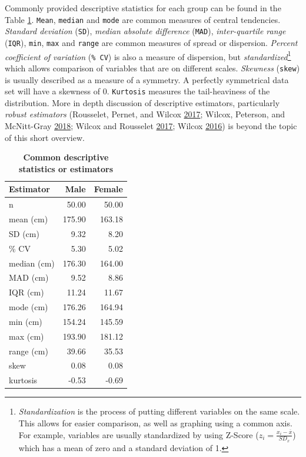 \documentclass[
]{book}
\begin{document}
Commonly provided descriptive statistics for each group can be found in the Table \ref{tab:common-descriptive-statistics-or-estimators}. \texttt{Mean}, \texttt{median} and \texttt{mode} are common measures of central tendencies. \emph{Standard deviation} (\texttt{SD}), \emph{median absolute difference} (\texttt{MAD}), \emph{inter-quartile range} (\texttt{IQR}), \texttt{min}, \texttt{max} and \texttt{range} are common measures of spread or dispersion. \emph{Percent coefficient of variation} (\texttt{\%\ CV}) is also a measure of dispersion, but \emph{standardized}\footnote{\emph{Standardization} is the process of putting different variables on the same scale. This allows for easier comparison, as well as graphing using a common axis. For example, variables are usually standardized by using Z-Score (\(z_{i} = \frac{x_{i} - \overline{x}}{SD_{x}}\)) which has a mean of zero and a standard deviation of 1.} which allows comparison of variables that are on different scales. \emph{Skewness} (\texttt{skew}) is usually described as a measure of a symmetry. A perfectly symmetrical data set will have a skewness of 0. \texttt{Kurtosis} measures the tail-heaviness of the distribution. More in depth discussion of descriptive estimators, particularly \emph{robust estimators} (Rousselet, Pernet, and Wilcox \protect\hyperlink{ref-rousseletDifferencesMeansRobust2017}{2017}; Wilcox, Peterson, and McNitt-Gray \protect\hyperlink{ref-wilcoxDataAnalysesWhen2018}{2018}; Wilcox and Rousselet \protect\hyperlink{ref-wilcoxGuideRobustStatistical2017}{2017}; Wilcox \protect\hyperlink{ref-wilcoxIntroductionRobustEstimation2016}{2016}) is beyond the topic of this short overview.



\begin{table}

\caption{\label{tab:common-descriptive-statistics-or-estimators}\textbf{Common descriptive statistics or estimators}}
\centering
\begin{tabular}[t]{lrr}
\toprule
Estimator & Male & Female\\
\midrule
n & 50.00 & 50.00\\
mean (cm) & 175.90 & 163.18\\
SD (cm) & 9.32 & 8.20\\
\% CV & 5.30 & 5.02\\
median (cm) & 176.30 & 164.00\\
\addlinespace
MAD (cm) & 9.52 & 8.86\\
IQR (cm) & 11.24 & 11.67\\
mode (cm) & 176.26 & 164.94\\
min (cm) & 154.24 & 145.59\\
max (cm) & 193.90 & 181.12\\
\addlinespace
range (cm) & 39.66 & 35.53\\
skew & 0.08 & 0.08\\
kurtosis & -0.53 & -0.69\\
\bottomrule
\end{tabular}
\end{table}
\end{document}
